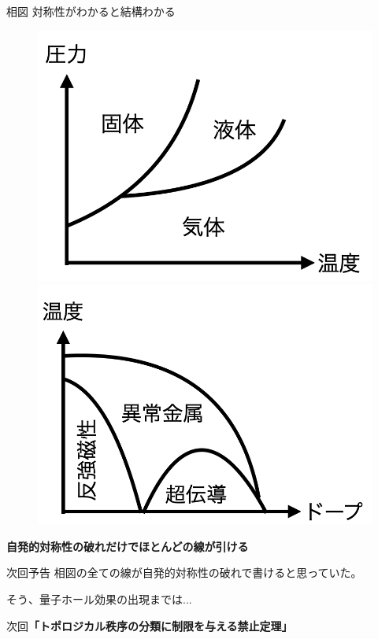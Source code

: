 \documentclass[dvipdfm]{beamer}
\begin{document}
\begin{frame}{相図}
    対称性がわかると結構わかる
    \begin{figure}
        \centering
        \begin{minipage}{0.45\linewidth}
            \includegraphics[width=0.8\linewidth]{phase3.png}
        \end{minipage}
        \begin{minipage}{0.45\linewidth}
            \includegraphics[width=0.8\linewidth]{phase-mag.png}
        \end{minipage}
    \end{figure}
    \textbf{自発的対称性の破れだけでほとんどの線が引ける}
\end{frame}

\begin{frame}{次回予告}
    相図の全ての線が自発的対称性の破れで書けると思っていた。

    そう、量子ホール効果の出現までは...

    次回\textbf{「トポロジカル秩序の分類に制限を与える禁止定理」}
\end{frame}
\end{document}

